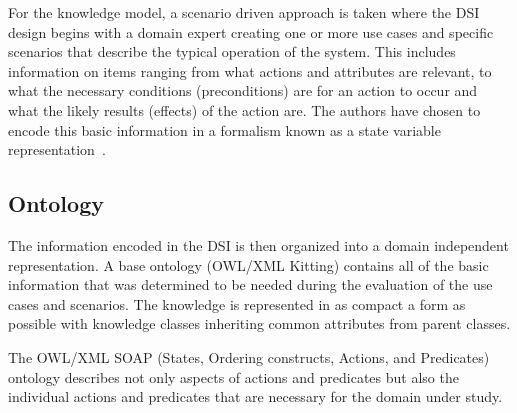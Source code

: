 For the knowledge model, a scenario driven approach is taken where the DSI design begins with a domain expert creating one or more use cases and specific scenarios that describe the typical operation of the system. This includes information on items ranging from what actions and attributes are relevant, to what the necessary conditions (preconditions) are for an action to occur and what the likely results (effects) of the action are. The authors have chosen to encode this basic information in a formalism known as a state variable representation~\cite{NAU.2004}.



\subsection{Ontology}
\label{subsection:ontology}
The information encoded in the DSI is then organized into a domain
independent representation. A base ontology (\textsf{OWL/XML Kitting})
contains all of the basic information that was determined to be needed
during the evaluation of the use cases and scenarios. The knowledge is
represented in as compact a form as possible with knowledge classes
inheriting common attributes from parent classes. 


The \textsf{OWL/XML SOAP} (States, Ordering constructs, Actions, and Predicates) ontology describes not only aspects of actions and predicates but also the individual actions and predicates that are necessary for the domain under study. 

